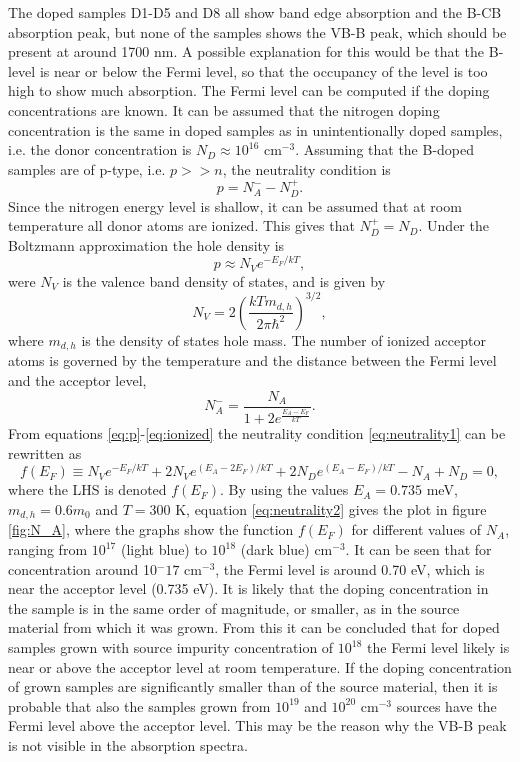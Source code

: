 The doped samples D1-D5 and D8 all show band edge absorption and the B-CB absorption peak, but none of the samples shows the VB-B peak, which should be present at around 1700 nm. A possible explanation for this would be that the B-level is near or below the Fermi level, so that the occupancy of the level is too high to show much absorption. The Fermi level can be computed if the doping concentrations are known. It can be assumed that the nitrogen doping concentration is the same in doped samples as in unintentionally doped samples, i.e. the donor concentration is $N_D \approx 10^{16}$ cm$^{-3}$. Assuming that the B-doped samples are of p-type, i.e. $p>>n$, the neutrality condition is
\begin{equation}
\label{eq:neutrality1}
p = N_A^- - N_D^+.
\end{equation}
Since the nitrogen energy level is shallow, it can be assumed that at room temperature all donor atoms are ionized. This gives that $N_D^+ =N_D$. Under the Boltzmann approximation the hole density is
\begin{equation}
\label{eq:p}
p \approx N_Ve^{-E_F/kT},
\end{equation}
were $N_V$ is the valence band density of states, and is given by
\begin{equation}
\label{eq:nv}
N_V = 2\left(\frac{kTm_{d,h}}{2\pi \hbar^2}\right)^{3/2},
\end{equation}
where $m_{d,h}$ is the density of states hole mass. The number of ionized acceptor atoms is governed by the temperature and the distance between the Fermi level and the acceptor level, 
\begin{equation}
\label{eq:ionized}
N_A^- = \frac{N_A}{1+2e^{\frac{E_A-E_F}{kT}}}.
\end{equation}
From equations \ref{eq:p}-\ref{eq:ionized} the neutrality condition \ref{eq:neutrality1} can be rewritten as
\begin{equation}
\label{eq:neutrality2}
f(E_F) \equiv N_Ve^{-E_F/kT}+2N_Ve^{(E_A-2E_F)/kT}+2N_De^{(E_A-E_F)/kT} - N_A + N_D = 0,
\end{equation}
where the LHS is denoted $f(E_F)$. By using the values $E_A = 0.735$ meV, $m_{d,h} = 0.6m_0$ and $T = 300$ K, equation \ref{eq:neutrality2} gives the plot in figure \ref{fig:N_A}, where the graphs show the function $f(E_F)$ for different values of $N_A$, ranging from $10^{17}$ (light blue) to $10^{18}$ (dark blue) cm$^{-3}$. It can be seen that for concentration around 10$^-{17}$ cm$^{-3}$, the Fermi level is around 0.70 eV, which is near the acceptor level (0.735 eV). It is likely that the doping concentration in the sample is in the same order of magnitude, or smaller, as in the source material from which it was grown. From this it can be concluded that for doped samples grown with source impurity concentration of $10^{18}$ the Fermi level likely is near or above the acceptor level at room temperature. If the doping concentration of grown samples are significantly smaller than of the source material, then it is probable that also the samples grown from $10^{19}$ and $10^{20}$ cm$^{-3}$ sources have the Fermi level above the acceptor level. This may be the reason why the VB-B peak is not visible in the absorption spectra. 

